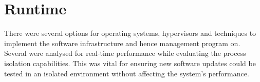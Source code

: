 \clearpage
\section{Runtime}

There were several options for operating systems, hypervisors and techniques to implement the software infrastructure and hence management program on. Several were analysed for real-time performance while evaluating the process isolation capabilities. This was vital for ensuring new software updates could be tested in an isolated environment without affecting the system's performance.




\clearpage


